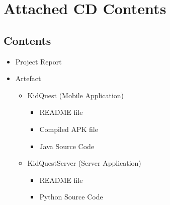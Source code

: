 \chapter{Attached CD Contents}

\section{Contents}
\begin{itemize}
	\item{Project Report}

	\item{Artefact}
	\begin{itemize}
		\item{KidQuest (Mobile Application)}
		\begin{itemize}
			\item{README file}
			\item{Compiled APK file}
			\item{Java Source Code}
		\end{itemize}
		\item{KidQuestServer (Server Application)}
		\begin{itemize}
			\item{README file}
			\item{Python Source Code}
		\end{itemize}
	\end{itemize}
\end{itemize}	